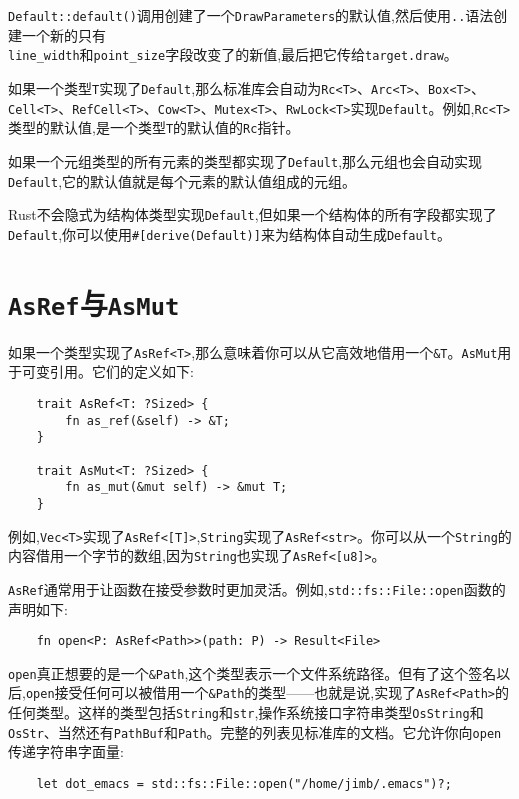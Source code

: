 \texttt{Default::default()}调用创建了一个\texttt{DrawParameters}的默认值,然后使用\texttt{..}语法创建一个新的只有\\
\texttt{line\_width}和\texttt{point\_size}字段改变了的新值,最后把它传给\texttt{target.draw}。

如果一个类型\texttt{T}实现了\texttt{Default},那么标准库会自动为\texttt{Rc<T>}、\texttt{Arc<T>}、\texttt{Box<T>}、\texttt{Cell<T>}、\texttt{RefCell<T>}、\texttt{Cow<T>}、\texttt{Mutex<T>}、\texttt{RwLock<T>}实现\texttt{Default}。例如,\texttt{Rc<T>}类型的默认值,是一个类型\texttt{T}的默认值的\texttt{Rc}指针。

如果一个元组类型的所有元素的类型都实现了\texttt{Default},那么元组也会自动实现\texttt{Default},它的默认值就是每个元素的默认值组成的元组。

Rust不会隐式为结构体类型实现\texttt{Default},但如果一个结构体的所有字段都实现了\texttt{Default},你可以使用\texttt{\#[derive(Default)]}来为结构体自动生成\texttt{Default}。

\section{\texttt{AsRef}与\texttt{AsMut}}\label{asref}

如果一个类型实现了\texttt{AsRef<T>},那么意味着你可以从它高效地借用一个\texttt{\&T}。\texttt{AsMut}用于可变引用。它们的定义如下:
\begin{verbatim}
    trait AsRef<T: ?Sized> {
        fn as_ref(&self) -> &T;
    }

    trait AsMut<T: ?Sized> {
        fn as_mut(&mut self) -> &mut T;
    }
\end{verbatim}

例如,\texttt{Vec<T>}实现了\texttt{AsRef<[T]>},\texttt{String}实现了\texttt{AsRef<str>}。你可以从一个\texttt{String}的内容借用一个字节的数组,因为\texttt{String}也实现了\texttt{AsRef<[u8]>}。

\texttt{AsRef}通常用于让函数在接受参数时更加灵活。例如,\texttt{std::fs::File::open}函数的声明如下:
\begin{verbatim}
    fn open<P: AsRef<Path>>(path: P) -> Result<File>
\end{verbatim}

\texttt{open}真正想要的是一个\texttt{\&Path},这个类型表示一个文件系统路径。但有了这个签名以后,\texttt{open}接受任何可以被借用一个\texttt{\&Path}的类型——也就是说,实现了\texttt{AsRef<Path>}的任何类型。这样的类型包括\texttt{String}和\texttt{str},操作系统接口字符串类型\texttt{OsString}和\texttt{OsStr}、当然还有\texttt{PathBuf}和\texttt{Path}。完整的列表见标准库的文档。它允许你向\texttt{open}传递字符串字面量:
\begin{verbatim}
    let dot_emacs = std::fs::File::open("/home/jimb/.emacs")?;
\end{verbatim}

